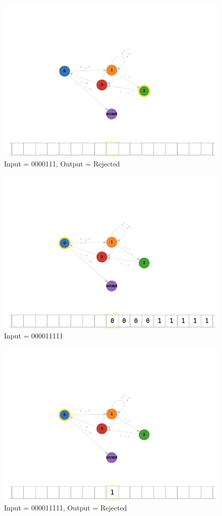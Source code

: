 \documentclass[12pt]{article}
\begin{document}
\begin{figure}[bp!]
    \caption{Input = 0000111, Output = Rejected}
    \centering
    \includegraphics[width=12cm]{Q1/0000111o.png}    
\end{figure}
\begin{figure}[bp!]
    \caption{Input = 000011111}
    \centering
    \includegraphics[width=12cm]{Q1/000011111.png}  
\end{figure}
\begin{figure}[bp!]
    \caption{Input = 000011111, Output = Rejected}
    \centering
    \includegraphics[width=12cm]{Q1/000011111o.png}  
\end{figure}
\end{document}
